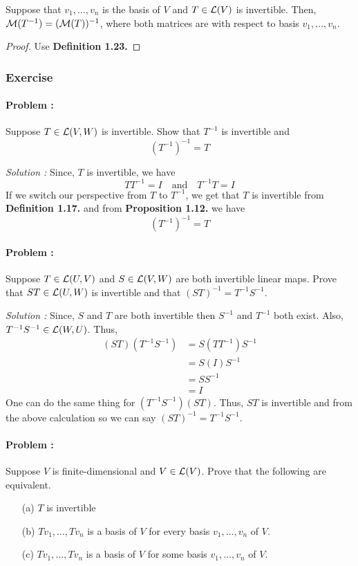\begin{proposition}
    Suppose that $v_1,\ldots,v_n$ is the basis of $V$ and $T \in \operatorname{\mathcal{L}}(V)$ is invertible. Then, 
    $\operatorname{\mathcal{M}}(T^{-1})=(\operatorname{\mathcal{M}}(T))^{-1}$, where both matrices are with respect to basis $v_1,\ldots,v_n$.
\end{proposition}


\begin{proof}
    Use \textbf{Definition 1.23.}
\end{proof}

\subsubsection{Exercise}


\paragraph{Problem :} Suppose $T \in \operatorname{\mathcal{L}}(V,W)$ is invertible. Show that $T^{-1}$ is invertible and 
\[ (T^{-1})^{-1}  = T \]

\vspace{4mm}
\textit{Solution :} Since, $T$ is invertible, we have 
\[ T T^{-1} = I \quad \text{and} \quad T^{-1} T = I \]
If we switch our perspective from $T$ to $T^{-1}$, we get that $T$ is invertible from \textbf{Definition 1.17.} and from 
\textbf{Proposition 1.12.} we have 
\[ (T^{-1})^{-1} = T \]

\paragraph{Problem :} Suppose $T \in \operatorname{\mathcal{L}}(U,V)$ and $S \in \operatorname{\mathcal{L}}(V,W)$ are both invertible linear maps. Prove that $ST \in \operatorname{\mathcal{L}}(U,W)$ is 
invertible and that $(ST)^{-1} = T^{-1} S^{-1}$.

\vspace{4mm}
\textit{Solution :} Since, $S$ and $T$ are both invertible then $S^{-1}$ and $T^{-1}$ both exist. Also, $T^{-1} S^{-1} \in \operatorname{\mathcal{L}}(W,U)$.
Thus,
\begin{align*}
    (ST)(T^{-1} S^{-1}) &= S(TT^{-1})S^{-1} \\
    &= S(I)S^{-1} \\
    &= SS^{-1} \\
    &= I
\end{align*}
One can do the same thing for $(T^{-1}S^{-1})(ST)$. Thus, $ST$ is invertible and from the above calculation so 
we can say $(ST)^{-1}=T^{-1}S^{-1}$.

\paragraph{Problem :} Suppose $V$ is finite-dimensional and $V \in \operatorname{\mathcal{L}}(V)$. Prove that the following are equivalent.
\begin{enumerate}
    \item[(a)] $T$ is invertible
    \item[(b)] $Tv_1,\ldots,Tv_n$ is a basis of $V$ for every basis $v_1,\ldots,v_n$ of $V$.
    \item[(c)] $Tv_1,\ldots,Tv_n$ is a basis of $V$ for some basis $v_1, \ldots,v_n$ of $V$.
\end{enumerate}

